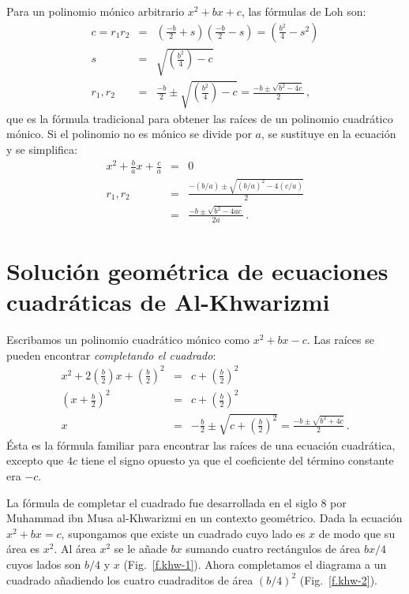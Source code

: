 Para un polinomio mónico arbitrario $x^2+bx+c$, las fórmulas de Loh son:
\begin{eqnarray*}
c=r_1r_2&=&\left(\frac{-b}{2}+s\right)  \left(\frac{-b}{2}-s\right)=\left(\frac{b^2}{4}-s^2\right)\\
s&=&\sqrt{\left(\frac{b^2}{4}\right)-c}\\
r_1,r_2&=&\frac{-b}{2}\pm\sqrt{\left(\frac{b^2}{4}\right)-c}=\frac{-b\pm\sqrt{b^2-4c}}{2}\,,
\end{eqnarray*}
que es la fórmula tradicional para obtener las raíces de un polinomio cuadrático mónico. Si el polinomio no es mónico se divide por $a$, se sustituye en la ecuación y se simplifica:
\begin{eqnarray*}
x^2+\frac{b}{a}x+\frac{c}{a}&=&0\\
r_1,r_2&=&\frac{-(b/a)\pm\sqrt{(b/a)^2-4(c/a)}}{2}\\
&=&\frac{-b\pm\sqrt{b^2-4ac}}{2a}\,.
\end{eqnarray*}

\section[Ecuaciones cuadráticas de Al-Khwarizmi]{Solución geométrica de ecuaciones cuadráticas de Al-Khwarizmi}\label{s.khwar}

Escribamos un polinomio cuadrático mónico como $x^2+bx-c$. Las raíces se pueden encontrar \emph{completando el cuadrado}:
\begin{eqnarray*}
x^2+2\left(\frac{b}{2}\right)x+\left(\frac{b}{2}\right)^2&=&c+\left(\frac{b}{2}\right)^2\\
\left(x+\frac{b}{2}\right)^2&=&c+\left(\frac{b}{2}\right)^2\\
x&=&-\frac{b}{2}\pm\sqrt{c+\left(\frac{b}{2}\right)^2}=
\frac{-b\pm\sqrt{b^2+4c}}{2}\,.
\end{eqnarray*}
Ésta es la fórmula familiar para encontrar las raíces de una ecuación cuadrática, excepto que $4c$ tiene el signo opuesto ya que el coeficiente del término constante era $-c$.

La fórmula de completar el cuadrado fue desarrollada en el siglo $8$ por Muhammad ibn Musa al-Khwarizmi en un contexto geométrico. Dada la ecuación $x^2+bx=c$, supongamos que existe un cuadrado cuyo lado es 
$x$ de modo que su área es $x^2$.
Al área $x^2$ se le añade $bx$ sumando cuatro rectángulos de área $bx/4$ cuyos lados son $b/4$ y $x$ (Fig.~\ref{f.khw-1}). Ahora completamos el diagrama a un cuadrado añadiendo los cuatro cuadraditos de área $(b/4)^2$ (Fig.~\ref{f.khw-2}).

